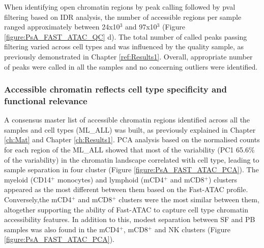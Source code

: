 When identifying open chromatin regions by peak calling followed by pval filtering based on IDR analysis, the number of accessible regions per sample ranged approximately between 24x10$^3$ and 97x10$^3$ (Figure \ref{figure:PsA_FAST_ATAC_QC} d). The total number of called peaks passing filtering varied across cell types and was influenced by the quality sample, as previously demonstrated in Chapter \ref{ref:Results1}. Overall, appropriate number of peaks were called in all the samples and no concerning outliers were identified.


\subsubsection{Accessible chromatin reflects cell type specificity and functional relevance}
A consensus master list of accessible chromatin regions identified across all the samples and cell types (ML\_ALL) was built, as previously explained in Chapter \ref{ch:Mat} and Chapter \ref{ch:Results1}. PCA analysis based on the normalised counts for each region of the ML\_ALL showed that most of the variability (PC1 65.6\% of the variability) in the chromatin landscape correlated with cell type, leading to sample separation in four cluster (Figure \ref{figure:PsA_FAST_ATAC_PCA}). The myeloid (CD14$^+$ monocytes) and lymphoid (mCD4$^+$ and mCD8$^+$) clusters appeared as the most different between them based on the Fast-ATAC profile. Conversely,the mCD4$^+$ and mCD8$^+$ clusters were the most similar between them, altogether supporting the ability of Fast-ATAC to capture cell type chromatin accessibility features. In addition to this, modest separation between SF and PB samples was also found in the mCD4$^+$, mCD8$^+$ and NK clusters (Figure \ref{figure:PsA_FAST_ATAC_PCA}).

